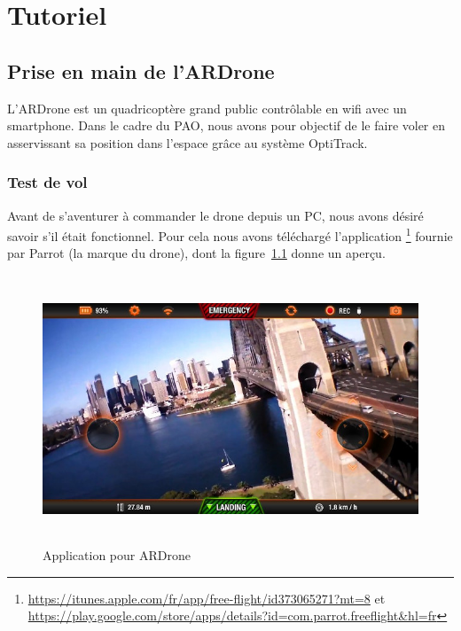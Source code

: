 \chapter{Tutoriel}
\label{chap:tutoriel}

    \section{Prise en main de l'ARDrone}
    \label{sec:prise_en_main_de_l_ardrone}
        L'ARDrone est un quadricoptère grand public contrôlable en wifi avec un smartphone. Dans le cadre du PAO, nous avons pour objectif de le faire voler en asservissant sa position dans l'espace grâce au système OptiTrack.

        \subsection{Test de vol}
            Avant de s'aventurer à commander le drone depuis un PC, nous avons désiré savoir s'il était fonctionnel. Pour cela nous avons téléchargé l'application \footnote{\url{https://itunes.apple.com/fr/app/free-flight/id373065271?mt=8} et \url{https://play.google.com/store/apps/details?id=com.parrot.freeflight&hl=fr}} fournie par Parrot (la marque du drone), dont la figure~\ref{fig:application_ardrone} donne un aperçu.

            \begin{figure}[h]
              \centering
              \includegraphics[height=8cm]{images/application_ardrone.jpg}
              \caption{Application pour ARDrone}
              \label{fig:application_ardrone}
            \end{figure}

